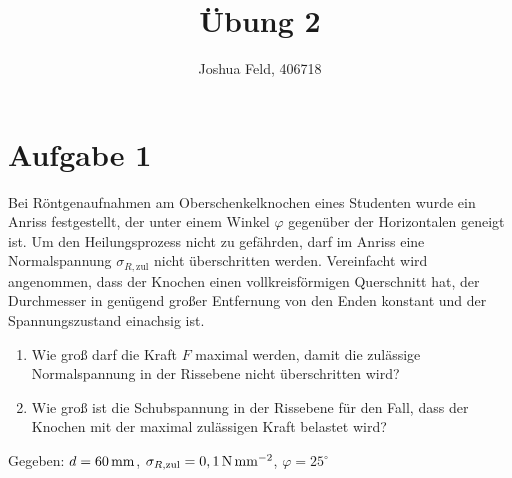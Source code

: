 \documentclass{exercise}
\institute{Lehr- und Forschungsgebiet Kontinuumsmechanik}
\title{Übung 2}
\author{Joshua Feld, 406718}
\begin{document}
    \maketitle


    \section*{Aufgabe 1}

    \begin{problem}
        Bei Röntgenaufnahmen am Oberschenkelknochen eines Studenten wurde ein Anriss festgestellt, der unter einem Winkel \(\varphi\) gegenüber der Horizontalen geneigt ist.
        Um den Heilungsprozess nicht zu gefährden, darf im Anriss eine Normalspannung \(\sigma_{R, \text{zul}}\) nicht überschritten werden.
        Vereinfacht wird angenommen, dass der Knochen einen vollkreisförmigen Querschnitt hat, der Durchmesser in genügend großer Entfernung von den Enden konstant und der Spannungszustand einachsig ist.
        \begin{enumerate}
            \item Wie groß darf die Kraft \(F\) maximal werden, damit die zulässige Normalspannung in der Rissebene nicht überschritten wird?
            \item Wie groß ist die Schubspannung in der Rissebene für den Fall, dass der Knochen mit der maximal zulässigen Kraft belastet wird?
        \end{enumerate}
        Gegeben: \(d = 60\,\si{\milli\meter}\), \(\sigma_{R, \text{zul}} = 0,1\,\si{\newton\per\milli\meter\squared}\), \(\varphi = 25^\circ\)
    \end{problem}
\end{document}

